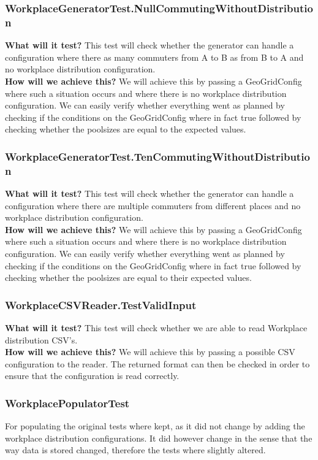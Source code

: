 \documentclass{article}
\begin{document}
\subsubsection{WorkplaceGeneratorTest.NullCommutingWithoutDistribution}
\textbf{What will it test?}
This test will check whether the generator can handle a configuration where there as many commuters from A to B as from B to A and no workplace distribution configuration.\\
\newline
\textbf{How will we achieve this?}
We will achieve this by passing a GeoGridConfig where such a situation occurs and where there is no workplace distribution configuration. We can easily verify whether everything went as planned by checking if the conditions on the GeoGridConfig where in fact true followed by checking whether the poolsizes are equal to the expected values.

\subsubsection{WorkplaceGeneratorTest.TenCommutingWithoutDistribution}
\textbf{What will it test?}
This test will check whether the generator can handle a configuration where there are multiple commuters from different places and no workplace distribution configuration.\\
\newline
\textbf{How will we achieve this?}
We will achieve this by passing a GeoGridConfig where such a situation occurs and where there is no workplace distribution configuration. We can easily verify whether everything went as planned by checking if the conditions on the GeoGridConfig where in fact true followed by checking whether the poolsizes are equal to their expected values.

\subsubsection{WorkplaceCSVReader.TestValidInput}
\textbf{What will it test?}
This test will check whether we are able to read Workplace distribution CSV's.\\
\newline
\textbf{How will we achieve this?}
We will achieve this by passing a possible CSV configuration to the reader. The returned format can then be checked in order to ensure that the configuration is read correctly.

\subsubsection{WorkplacePopulatorTest}
For populating the original tests where kept, as it did not change by adding the workplace distribution configurations. It did however change in the sense that the way data is stored changed, therefore the tests where slightly altered.
\end{document}

